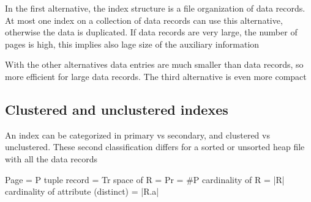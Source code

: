\documentclass[12pt, a4paper]{article}
\begin{document}
In the first alternative, the index structure is a file organization of data records. At most one index on a 
collection of data records can use this alternative, otherwise the data is duplicated. If data records are 
very large, the number of pages is high, this implies also lage size of the auxiliary information

With the other alternatives data entries are much smaller than data records, so more efficient for large data 
records. The third alternative is even more compact

\subsection{Clustered and unclustered indexes}
An index can be categorized in primary vs secondary, and clustered vs unclustered. These second classification
differs for a sorted or unsorted heap file with all the data records


Page = P
tuple record = Tr
space of R = Pr = \#P
cardinality of R = |R|
cardinality of attribute (distinct) = |R.a|
\end{document}
